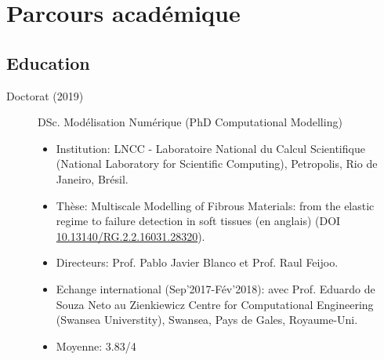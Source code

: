 \documentclass[french]{article}
\begin{document}
\section*{Parcours académique}
\subsection*{Education}
\begin{description}
\item[Doctorat (2019)] DSc. Modélisation Numérique (PhD Computational Modelling)
\begin{itemize}
\item Institution: LNCC - Laboratoire National du Calcul Scientifique (National Laboratory for Scientific Computing),  Petropolis, Rio de Janeiro, Brésil.
\item Thèse: Multiscale Modelling of Fibrous Materials: from the elastic regime to failure detection in soft tissues (en anglais) (DOI \url{10.13140/RG.2.2.16031.28320}).
\item Directeurs: Prof. Pablo Javier Blanco et Prof. Raul Feijoo.
\item Echange international (Sep'2017-Fév'2018): avec Prof. Eduardo de Souza Neto au Zienkiewicz Centre for Computational Engineering (Swansea Universtity), Swansea, Pays de Gales, Royaume-Uni.
\item Moyenne: 3.83/4 

\end{itemize}
\end{description}
\end{document}
